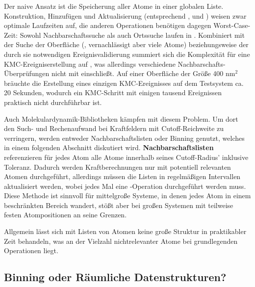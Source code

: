 Der naive Ansatz ist die Speicherung aller Atome in einer globalen Liste.
Konstruktion, Hinzufügen und Aktualisierung (entsprechend ,  und ) weisen zwar optimale Laufzeiten auf, die anderen Operationen benötigen dagegen Worst-Case-Zeit:
Sowohl Nachbarschaftssuche als auch Ortssuche laufen in .
Kombiniert mit der Suche der Oberfläche (, vernachlässigt aber viele Atome) beziehungsweise der durch sie notwendigen Ereignisvalidierung summiert sich die Komplexität für eine KMC-Ereigniserstellung auf , was allerdings verschiedene Nachbarschafts-Überprüfungen nicht mit einschließt.
Auf einer Oberfläche der Größe 400 nm$^2$ bräuchte die Erstellung eines einzigen KMC-Ereignisses auf dem Testsystem ca. 20 Sekunden, wodurch ein KMC-Schritt mit einigen tausend Ereignissen praktisch nicht durchführbar ist.

Auch Molekulardynamik-Bibliotheken kämpfen mit diesem Problem.
Um dort den Such- und Rechenaufwand bei Kraftfeldern mit Cutoff-Reichweite zu verringern, werden entweder Nachbarschaftslisten oder Binning genutzt, welches in einem folgenden Abschnitt diskutiert wird.
\textbf{Nachbarschaftslisten} referenzieren für jedes Atom alle Atome innerhalb seines Cutoff-Radius' inklusive Toleranz.
Dadurch werden Kraftberechnungen nur mit potentiell relevanten Atomen durchgeführt, allerdings müssen die Listen in regelmäßigen Intervallen aktualisiert werden, wobei jedes Mal eine -Operation durchgeführt werden muss.
Diese Methode ist sinnvoll für mittelgroße Systeme, in denen jedes Atom in einem beschränkten Bereich wandert, stößt aber bei großen Systemen mit teilweise festen Atompositionen an seine Grenzen.

Allgemein lässt sich mit Listen von Atomen keine große Struktur in praktikabler Zeit behandeln, was an der Vielzahl nichtrelevanter Atome bei grundlegenden Operationen liegt.

\subsection{Binning oder Räumliche Datenstrukturen?}


